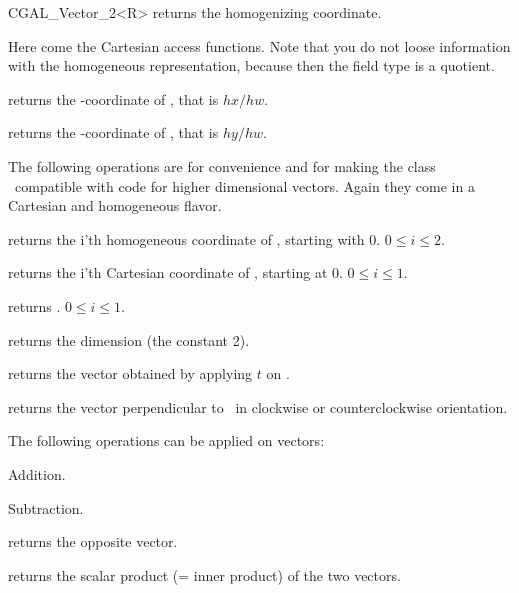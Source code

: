 \begin{ccClassTemplate} {CGAL_Vector_2<R>}
       {returns the homogenizing  coordinate.}

Here come the Cartesian access functions.  Note that you do not loose
information with the homogeneous representation, because then the field
type is a quotient.


       {returns the -coordinate of \ccVar, that is $hx/hw$.}

       {returns the -coordinate of \ccVar, that is $hy/hw$.}

The following operations are for convenience and for making the
class \ccClassName\ compatible with code for higher dimensional vectors.
Again they come in a Cartesian and homogeneous flavor.

       {returns the i'th homogeneous coordinate of \ccVar, starting with 0.
        \ccPrecond $0\leq i \leq 2$.}

       {returns the i'th Cartesian coordinate of \ccVar, starting at 0.
        \ccPrecond $0\leq i \leq 1$.}

       {returns  .
        \ccPrecond $0\leq i \leq 1$.}

       {returns the dimension (the constant 2).}

       {returns the vector obtained by applying $t$ on \ccVar.}

       {returns the vector perpendicular to \ccVar\ in clockwise or
        counterclockwise orientation.}

The following operations can be applied on vectors:

       {Addition.}

       {Subtraction.}

       {returns the opposite vector.}

       {returns the scalar product (= inner product) of the two vectors.}



\end{ccClassTemplate}
